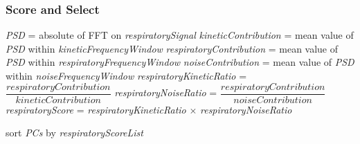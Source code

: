         \subsubsection{Score and Select} \label{sec:score_and_select}
            \begin{algorithm} \label{alg:frequency_score_pseudo_code}
                \caption{Frequency Score}
                \;
                \textit{PSD} = absolute of \gls{FFT} on \textit{respiratorySignal}\;
                \;
                \textit{kineticContribution} = mean value of \textit{PSD} within \textit{kineticFrequencyWindow}\;
                \textit{respiratoryContribution} = mean value of \textit{PSD}  within \textit{respiratoryFrequencyWindow}\;
                \textit{noiseContribution} = mean value of \textit{PSD} within \textit{noiseFrequencyWindow}\;
                \;
                \textit{respiratoryKineticRatio} = $\dfrac{\textit{respiratoryContribution}}{\textit{kineticContribution}}$\;
                \;
                \textit{respiratoryNoiseRatio} = $\dfrac{\textit{respiratoryContribution}}{\textit{noiseContribution}}$\;
                \;
                \textit{respiratoryScore} = \textit{respiratoryKineticRatio} $\times$ \textit{respiratoryNoiseRatio}\;
            \end{algorithm}
            
            \begin{algorithm} \label{alg:score_and_select_pseudo_code}
                \caption{Score and Select \glspl{PC}}
                \;
                sort \textit{PCs} by \textit{respiratoryScoreList}\;
            \end{algorithm}
        
